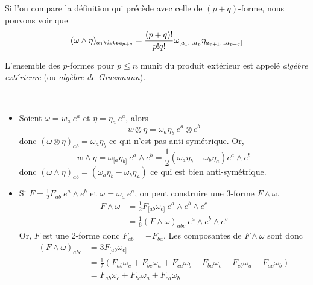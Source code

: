 \documentclass[a4paper,11pt]{report}
\begin{document}
            Si l'on compare la définition qui précède avec celle de $(p+q)$-forme, nous pouvons voir que
            \begin{equation}
                (\omega\wedge\eta)_{a_1\dotsa_{p+q}} = \frac{(p+q)!}{p!q!}\omega_{[a_1\dots a_p}\eta_{a_{p+1}\dots a_{p+q}]}
            \end{equation}
            
            \begin{defn}
                L'ensemble des $p$-formes pour $p\leq n$ munit du produit extérieur est appelé \textit{algèbre extérieure} (ou \textit{algèbre de Grassmann}).
            \end{defn}
            
            \begin{exmp}${}$
            \begin{itemize}[label = \textbullet]
                \item Soient $\omega = w_a ~e^a$ et $\eta = \eta_a ~e^a$, alors
                    \begin{equation}
                        w\otimes\eta = \omega_a\eta_b~ e^a\otimes e^b
                    \end{equation}
                    donc $(\omega\otimes\eta)_{ab} =\omega_a\eta_b$ ce qui n'est pas anti-symétrique. Or,
                    \begin{equation}
                        w\wedge\eta = \omega_{[a}\eta_{b]}~e^a\wedge e^b = \frac{1}{2}(\omega_a \eta_b-\omega_b\eta_a)e^a\wedge e^b
                    \end{equation}
                    donc $(\omega\wedge\eta)_{ab} =(\omega_a\eta_b-\omega_b\eta_a)$ ce qui est bien anti-symétrique.
                \item Si $F = \frac{1}{2} F_{ab}~e^a\wedge e^b$ et $\omega = \omega_a~ e^a$, on peut construire une 3-forme $F\wedge\omega$.
                \begin{align}
                    F\wedge\omega &= \frac{1}{2}F_{[ab}\omega_{c]}~e^a\wedge e^b \wedge e^c\\
                    &= \frac{1}{6}(F\wedge\omega)_{abc}~e^a\wedge e^b \wedge e^c
                \end{align}
                Or, $F$ est une 2-forme donc $F_{ab} = -F_{ba}$. Les composantes de $F\wedge\omega$ sont donc
                \begin{align}
                    (F\wedge\omega)_{abc} &= 3 F_{[ab}\omega_{c]}\\
                    &= \frac{1}{2}\left(F_{ab}\omega_c+F_{bc}\omega_a+F_{ca}\omega_b-F_{ba}\omega_c-F_{cb}\omega_a-F_{ac}\omega_b\right)\\
                    &= F_{ab}\omega_c+F_{bc}\omega_a+F_{ca}\omega_b
                \end{align}
            \end{itemize}
            \end{exmp}
            
\end{document}

